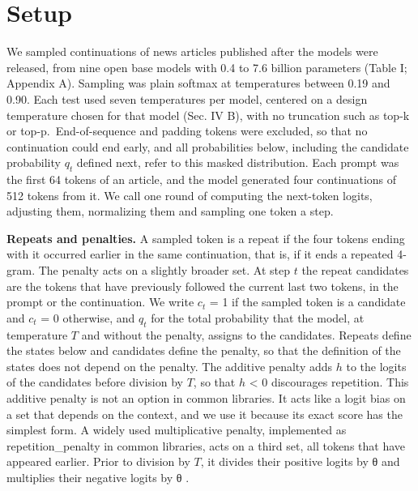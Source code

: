 \documentclass[aps,prx,onecolumn,superscriptaddress,longbibliography]{revtex4-2}
\begin{document}
\section{Setup}

We sampled continuations of news articles published after the models were released, from nine open base models with 0.4 to 7.6 billion parameters (Table I; Appendix A). Sampling was plain softmax at temperatures between 0.19 and 0.90. Each test used seven temperatures per model, centered on a design temperature chosen for that model (Sec. IV B), with no truncation such as top-k or top-p.~End-of-sequence and padding tokens were excluded, so that no continuation could end early, and all probabilities below, including the candidate probability \(q_{t}\) defined next, refer to this masked distribution. Each prompt was the first 64 tokens of an article, and the model generated four continuations of 512 tokens from it. We call one round of computing the next-token logits, adjusting them, normalizing them and sampling one token a step.

\textbf{Repeats and penalties.} A sampled token is a repeat if the four tokens ending with it occurred earlier in the same continuation, that is, if it ends a repeated 4-gram. The penalty acts on a slightly broader set. At step \(t\) the repeat candidates are the tokens that have previously followed the current last two tokens, in the prompt or the continuation. We write \(c_{t}\) = 1 if the sampled token is a candidate and \(c_{t}\) = 0 otherwise, and \(q_{t}\) for the total probability that the model, at temperature \(T\) and without the penalty, assigns to the candidates. Repeats define the states below and candidates define the penalty, so that the definition of the states does not depend on the penalty. The additive penalty adds \(h\) to the logits of the candidates before division by \(T\), so that \(h\) \textless{} 0 discourages repetition. This additive penalty is not an option in common libraries. It acts like a logit bias on a set that depends on the context, and we use it because its exact score has the simplest form. A widely used multiplicative penalty, implemented as repetition\_penalty in common libraries, acts on a third set, all tokens that have appeared earlier. Prior to division by \(T\), it divides their positive logits by θ and multiplies their negative logits by θ \cite{1909.05858,1910.03771}.
\end{document}
